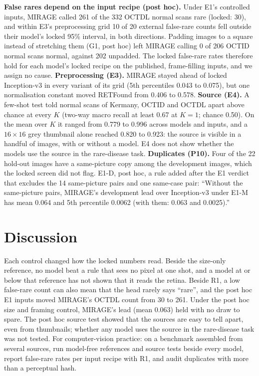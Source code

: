 \documentclass[conference]{IEEEtran}
\begin{document}
\textbf{False rares depend on the input recipe (post hoc).} Under E1's controlled inputs, MIRAGE called 261 of the 332 OCTDL normal scans rare (locked: 30), and within E3's preprocessing grid 10 of 20 external false-rare counts fell outside their model's locked 95\% interval, in both directions. Padding images to a square instead of stretching them (G1, post hoc) left MIRAGE calling 0 of 206 OCTID normal scans normal, against 202 unpadded. The locked false-rare rates therefore hold for each model's locked recipe on the published, frame-filling inputs, and we assign no cause.
\textbf{Preprocessing (E3).} MIRAGE stayed ahead of locked Inception-v3 in every variant of its grid (5th percentiles 0.043 to 0.075), but one normalisation constant moved RETFound from 0.406 to 0.578.
\textbf{Source (E4).} A few-shot test told normal scans of Kermany, OCTID and OCTDL apart above chance at every $K$ (two-way macro recall at least 0.67 at $K=1$; chance 0.50). On the mean over $K$ it ranged from 0.779 to 0.996 across models and inputs, and a $16\times16$ grey thumbnail alone reached 0.820 to 0.923: the source is visible in a handful of images, with or without a model. E4 does not show whether the models use the source in the rare-disease task.
\textbf{Duplicates (P10).} Four of the 22 hold-out images have a same-picture copy among the development images, which the locked screen did not flag. E1-D, post hoc, a rule added after the E1 verdict that excludes the 14 same-picture pairs and one same-case pair: ``Without the same-picture pairs, MIRAGE's development lead over Inception-v3 under E1-M has mean 0.064 and 5th percentile 0.0062 (with them: 0.063 and 0.0025).''

\section{Discussion}
Each control changed how the locked numbers read. Beside the size-only reference, no model beat a rule that sees no pixel at one shot, and a model at or below that reference has not shown that it reads the retina. Beside R1, a low false-rare count can also mean that the head rarely says ``rare'', and the post hoc E1 inputs moved MIRAGE's OCTDL count from 30 to 261. Under the post hoc size and framing control, MIRAGE's lead (mean 0.063) held with no draw to spare. The post hoc source test showed that the sources are easy to tell apart, even from thumbnails; whether any model uses the source in the rare-disease task was not tested. For computer-vision practice: on a benchmark assembled from several sources, run model-free references and source tests beside every model, report false-rare rates per input recipe with R1, and audit duplicates with more than a perceptual hash.
\end{document}
